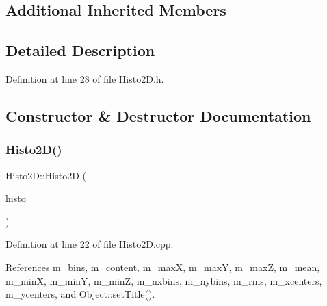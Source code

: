 \subsection*{Additional Inherited Members}


\subsection{Detailed Description}


Definition at line 28 of file Histo2\+D.\+h.



\subsection{Constructor \& Destructor Documentation}
\mbox{\label{classHisto2D_acdeb6b732d7b596dea8a282813cd1c18}} 
\subsubsection{\texorpdfstring{Histo2\+D()}{Histo2D()}}
{\footnotesize\ttfamily Histo2\+D\+::\+Histo2D (\begin{DoxyParamCaption}\item[{T\+H2D $\ast$}]{histo }\end{DoxyParamCaption})}



Definition at line 22 of file Histo2\+D.\+cpp.



References m\+\_\+bins, m\+\_\+content, m\+\_\+maxX, m\+\_\+maxY, m\+\_\+maxZ, m\+\_\+mean, m\+\_\+minX, m\+\_\+minY, m\+\_\+minZ, m\+\_\+nxbins, m\+\_\+nybins, m\+\_\+rms, m\+\_\+xcenters, m\+\_\+ycenters, and Object\+::set\+Title().


